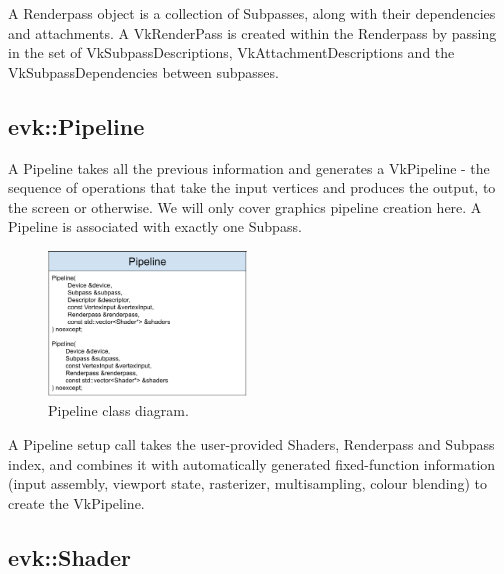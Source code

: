 \documentclass[12pt]{report}
\newcommand{\imagewidth}{0.47\textwidth}
\theoremstyle{definition}
\begin{document}
        A Renderpass object is a collection of Subpasses, along with their
        dependencies and attachments. A VkRenderPass is created within the
        Renderpass by passing in the set of VkSubpassDescriptions,
        VkAttachmentDescriptions and the VkSubpassDependencies between
        subpasses.

      \subsection{evk::Pipeline}

        A Pipeline takes all the previous information and generates a
        VkPipeline - the sequence of operations that take the input vertices
        and produces the output, to the screen or otherwise. We will only
        cover graphics pipeline creation here. A Pipeline is associated with
        exactly one Subpass.
        
        \begin{figure}[h]
          \centering
          \includegraphics[width=\imagewidth]{images/class_pipeline.png}
          \caption{Pipeline class diagram.}
          \label{fig:class_pipeline}
        \end{figure}

        A Pipeline setup call takes the user-provided Shaders, Renderpass and
        Subpass index, and combines it with automatically generated
        fixed-function information (input assembly, viewport state,
        rasterizer, multisampling, colour blending) to create the VkPipeline.

      \subsection{evk::Shader}
\end{document}
